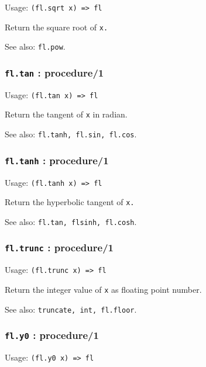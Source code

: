 \documentclass[
]{article}
\newcommand{\passthrough}[1]{#1}
\begin{document}
Usage: \passthrough{\lstinline!(fl.sqrt x) => fl!}

Return the square root of \passthrough{\lstinline!x.!}

See also: \passthrough{\lstinline!fl.pow!}.

\hypertarget{fl.tan-procedure1}{%
\subsubsection{\texorpdfstring{\texttt{fl.tan} :
procedure/1}{fl.tan : procedure/1}}\label{fl.tan-procedure1}}

Usage: \passthrough{\lstinline!(fl.tan x) => fl!}

Return the tangent of \passthrough{\lstinline!x!} in radian.

See also: \passthrough{\lstinline!fl.tanh, fl.sin, fl.cos!}.

\hypertarget{fl.tanh-procedure1}{%
\subsubsection{\texorpdfstring{\texttt{fl.tanh} :
procedure/1}{fl.tanh : procedure/1}}\label{fl.tanh-procedure1}}

Usage: \passthrough{\lstinline!(fl.tanh x) => fl!}

Return the hyperbolic tangent of \passthrough{\lstinline!x.!}

See also: \passthrough{\lstinline!fl.tan, flsinh, fl.cosh!}.

\hypertarget{fl.trunc-procedure1}{%
\subsubsection{\texorpdfstring{\texttt{fl.trunc} :
procedure/1}{fl.trunc : procedure/1}}\label{fl.trunc-procedure1}}

Usage: \passthrough{\lstinline!(fl.trunc x) => fl!}

Return the integer value of \passthrough{\lstinline!x!} as floating
point number.

See also: \passthrough{\lstinline!truncate, int, fl.floor!}.

\hypertarget{fl.y0-procedure1}{%
\subsubsection{\texorpdfstring{\texttt{fl.y0} :
procedure/1}{fl.y0 : procedure/1}}\label{fl.y0-procedure1}}

Usage: \passthrough{\lstinline!(fl.y0 x) => fl!}
\end{document}
